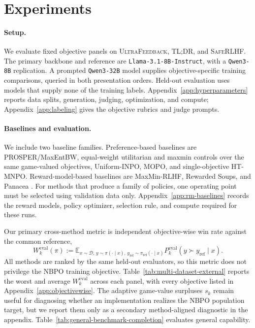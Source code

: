 \documentclass{article}
\theoremstyle{remark}
\theoremstyle{plain}
\newcommand{\E}{\mathbb{E}}
\newcommand{\D}{\mathcal{D}}
\newcommand{\piref}{\pi_{\mathrm{ref}}}
\begin{document}
\section{Experiments}
\label{sec:experiments}
\paragraph{Setup.}
We evaluate fixed objective panels on \textsc{UltraFeedback}, \textsc{TL;DR}, and \textsc{SafeRLHF}. The primary backbone and reference are \texttt{Llama-3.1-8B-Instruct}, with a \texttt{Qwen3-8B} replication. A prompted \texttt{Qwen3-32B} model supplies objective-specific training comparisons, queried in both presentation orders. Held-out evaluation uses models that supply none of the training labels. Appendix~\ref{app:hyperparameters} reports data splits, generation, judging, optimization, and compute; Appendix~\ref{app:labeling} gives the objective rubrics and judge prompts.

\paragraph{Baselines and evaluation.}
We include two baseline families. Preference-based baselines are PROSPER/MaxEntBW, equal-weight utilitarian and maxmin controls over the same game-valued objectives, Uniform-INPO, MOPO, and single-objective HT-MNPO. Reward-model-based baselines are MaxMin-RLHF, Rewarded Soups, and Panacea \citep{chakraborty2024maxmin,rame2023rewarded,zhong2024panacea}. For methods that produce a family of policies, one operating point must be selected using validation data only. Appendix~\ref{app:rm-baselines} records the reward models, policy optimizer, selection rule, and compute required for these runs.

Our primary cross-method metric is independent objective-wise win rate against the common reference,
\begin{equation}
W_k^{\mathrm{eval}}(\pi)
:=
\E_{x\sim\D,\,y\sim\pi(\cdot\mid x),\,y_{\mathrm{ref}}\sim\piref(\cdot\mid x)}
P_k^{\mathrm{eval}}(y\succ y_{\mathrm{ref}}\mid x).
\label{eq:external-win-rate}
\end{equation}
All methods are ranked by the same held-out evaluators, so this metric does not privilege the NBPO training objective. Table~\ref{tab:multi-dataset-external} reports the worst and average $W_k^{\mathrm{eval}}$ across each panel, with every objective listed in Appendix~\ref{app:objectivewise}. The adaptive game-value surpluses $s_k$ remain useful for diagnosing whether an implementation realizes the NBPO population target, but we report them only as a secondary method-aligned diagnostic in the appendix. Table~\ref{tab:general-benchmark-completion} evaluates general capability.
\end{document}
